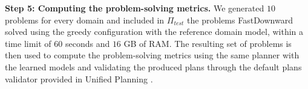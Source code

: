 \documentclass[letterpaper]{article} %
\newcommand{\T}{T}
\newcommand{\Ttrain}{\T_{\textit{train}}}
\newcommand{\Ttest}{\T_{\textit{test}}}
\newcommand{\miniparagraph}[1]{\textbf{#1.}}
\newcommand{\stest}{\ensuremath{S_{\textit{test}}}\xspace}
\newcommand{\ptest}{\ensuremath{\Pi_{\textit{test}}}\xspace}
\newif\ifaddcomments
\newcommand{\roni}[1]{\ifaddcomments{\textcolor{red}{[Roni: #1]}}\fi}
\newcommand{\leo}[1]{\ifaddcomments{\textcolor{pink}{[Leonardo: #1]}}\fi}
\begin{document}







%
\miniparagraph{Step 5: Computing the problem-solving metrics}
We generated $10$ problems for every domain and included in $\ptest$ the problems FastDownward solved using the greedy configuration with the reference domain model, within a time limit of $60$ seconds and $16$ GB of RAM. 
The resulting set of problems is then used to compute the problem-solving metrics using the same planner with the learned models and validating the produced plans through the default plans validator provided in Unified Planning \cite{unified_planning_softwarex2025} . 
\end{document}
